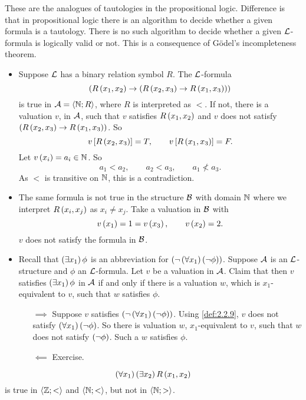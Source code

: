 These are the analogues of tautologies in the propositional logic. Difference is that in propositional logic there is an algorithm to decide whether a given formula is a tautology. There is no such algorithm to decide whether a given $ \LL $-formula is logically valid or not. This is a consequence of G\"odel's incompleteness theorem.

\begin{example1}
\hfill
\begin{itemize}
\item Suppose $ \LL $ has a binary relation symbol $ R $. The $ \LL $-formula
$$ \impb{R\rb{x_1, x_2}}{\impb{R\rb{x_2, x_3}}{R\rb{x_1, x_3}}} $$
is true in $ \AA = \ab{\N; R} $, where $ R $ is interpreted as $ < $. If not, there is a valuation $ v $, in $ \AA $, such that $ v $ satisfies $ R\rb{x_1, x_2} $ and $ v $ does not satisfy $ \impb{R\rb{x_2, x_3}}{R\rb{x_1, x_3}} $. So
$$ v\sb{R\rb{x_2, x_3}} = T, \qquad v\sb{R\rb{x_1, x_3}} = F. $$
Let $ v\rb{x_i} = a_i \in \N $. So
$$ a_1 < a_2, \qquad a_2 < a_3, \qquad a_1 \not< a_3. $$
As $ < $ is transitive on $ \N $, this is a contradiction.
\item The same formula is not true in the structure $ \BB $ with domain $ \N $ where we interpret $ R\rb{x_i, x_j} $ as $ x_i \ne x_j $. Take a valuation in $ \BB $ with
$$ v\rb{x_1} = 1 = v\rb{x_3}, \qquad v\rb{x_2} = 2. $$
$ v $ does not satisfy the formula in $ \BB $.
\item Recall that $ \teb{x_1}\phi $ is an abbreviation for $ \notb{\fab{x_1}\notb{\phi}} $. Suppose $ \AA $ is an $ \LL $-structure and $ \phi $ an $ \LL $-formula. Let $ v $ be a valuation in $ \AA $. Claim that then $ v $ satisfies $ \teb{x_1}\phi $ in $ \AA $ if and only if there is a valuation $ w $, which is $ x_1 $-equivalent to $ v $, such that $ w $ satisfies $ \phi $.
\begin{itemize}
\item[$ \implies $] Suppose $ v $ satisfies $ \notb{\fab{x_1}\notb{\phi}} $. Using \ref{def:2.2.9}, $ v $ does not satisfy $ \fab{x_1}\notb{\phi} $. So there is valuation $ w $, $ x_1 $-equivalent to $ v $, such that $ w $ does not satisfy $ \notb{\phi} $. Such a $ w $ satisfies $ \phi $.
\item[$ \impliedby $] Exercise.
\end{itemize}
\end{itemize}
\end{example1}

\begin{example1}
$$ \fab{x_1}\teb{x_2}R\rb{x_1, x_2} $$
is true in $ \ab{\Z; <} $ and $ \ab{\N; <} $, but not in $ \ab{\N; >} $.
\end{example1}

